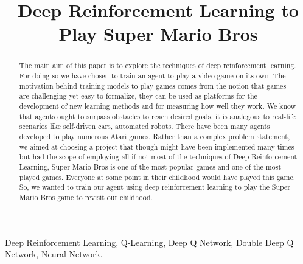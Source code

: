 \documentclass[conference]{IEEEtran}
\theoremstyle{definition}
\begin{document}
\title{Deep Reinforcement Learning to Play Super Mario Bros}
\author{
}

\maketitle
\IEEEpeerreviewmaketitle

\begin{abstract}

The main aim of this paper is to explore the techniques of deep reinforcement learning. For doing so we have chosen to train an agent to play a video game on its own. The motivation behind training models to play games comes from the notion that games are challenging yet easy to formalize, they can be used as platforms for the development of new learning methods and for measuring how well they work. We know that agents ought to surpass obstacles to reach desired goals, it is analogous to real-life scenarios like self-driven cars, automated robots. There have been many agents developed to play numerous Atari games\cite{mnih2013playing}. Rather than a complex problem statement, we aimed at choosing a project that though might have been implemented many times but had the scope of employing all if not most of the techniques of Deep Reinforcement Learning, Super Mario Bros is one of the most popular games and one of the most played games. Everyone at some point in their childhood would have played this game. So, we wanted to train our agent using deep reinforcement learning to play the Super Mario Bros game to revisit our childhood. 
\\
\end{abstract}

\begin{IEEEkeywords}
Deep Reinforcement Learning, Q-Learning, Deep Q Network, Double Deep Q Network, Neural Network.
\end{IEEEkeywords}
\end{document}
